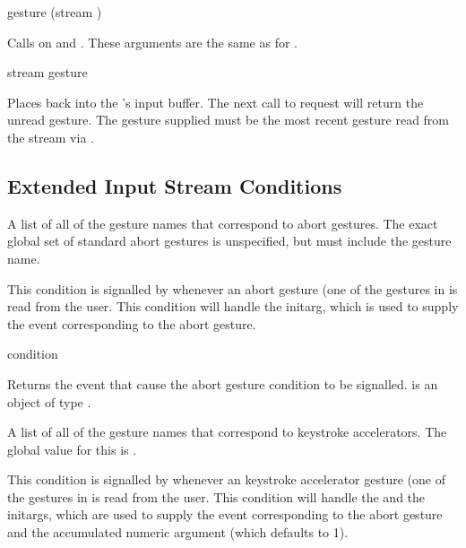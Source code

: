  {gesture \key (stream )}

Calls  on  and .  These
arguments are the same as for .

 {stream gesture}

Places  back into the  's
input buffer.  The next call to  request will return the
unread gesture.  The gesture supplied must be the most recent gesture read from
the stream via .


\subsection {Extended Input Stream Conditions}


A list of all of the gesture names that correspond to abort gestures.  The
exact global set of standard abort gestures is unspecified, but must include
the  gesture name.


This condition is signalled by  whenever an abort gesture (one
of the gestures in  is read from the user.  This condition
will handle the  initarg, which is used to supply the event
corresponding to the abort gesture.

 {condition}

Returns the event that cause the abort gesture condition to be signalled.
 is an object of type .


A list of all of the gesture names that correspond to keystroke accelerators.
The global value for this is .


This condition is signalled by  whenever an keystroke
accelerator gesture (one of the gestures in  is read
from the user.  This condition will handle the  and the
 initargs, which are used to supply the event
corresponding to the abort gesture and the accumulated numeric argument (which
defaults to 1).

